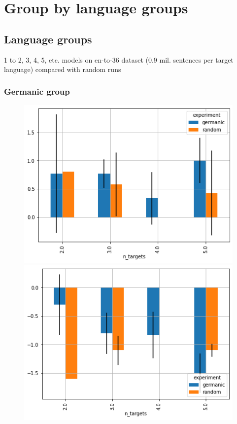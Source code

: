 \chapter{Group by language groups}

\section{Language groups}
1 to 2, 3, 4, 5, etc. models on en-to-36 dataset (0.9 mil. sentences per target language)
compared with random runs
\subsection{Germanic group}

\begin{figure}[h]
	\begin{minipage}{0.48\textwidth}
	\centering
	\includegraphics[width=0.9\columnwidth]{../img/de_opensubtitles_13_1.png}
	\end{minipage}\hfill
	\begin{minipage}{0.48\textwidth}
	\centering
	\includegraphics[width=0.9\columnwidth]{../img/de_multiun_25_4.png}

\end{minipage}
\end{figure}
